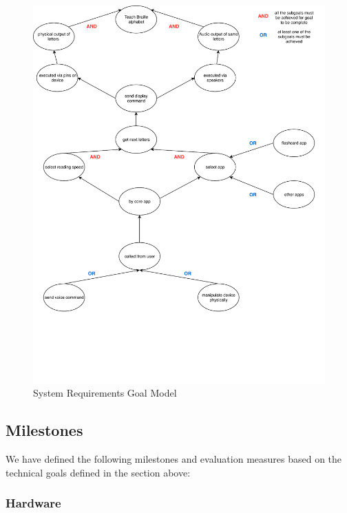 \documentclass{article}
\begin{document}
\begin{figure}[h]
\vskip 5mm
\begin{center}
\centerline{\includegraphics[width=\textwidth]{figs/goalmodeling}}
\caption{System Requirements Goal Model}
\label{fig:goalmodel}
\end{center}
\vskip -5mm
\end{figure} 

\subsection{Milestones} 

We have defined the following milestones and evaluation measures based on the technical goals defined in the section above:

\subsubsection{Hardware}
\end{document}
